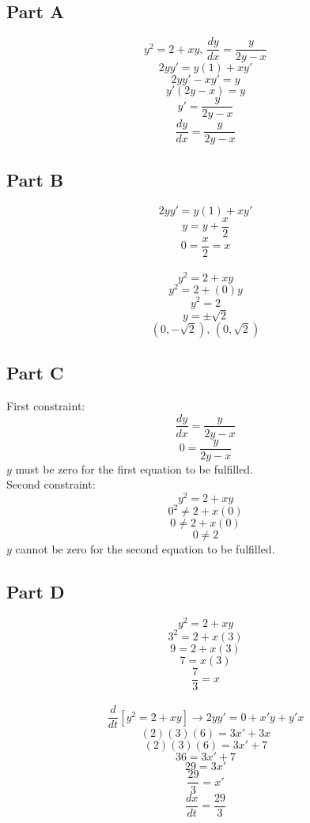 \subsection{Part A}
\[ y^2 = 2 + xy ,\, \frac{dy}{dx} = \frac{y}{2y-x} \]
\[ 2yy' = y(1) + xy' \]
\[ 2yy'- xy' = y  \]
\[ y'(2y- x) = y  \]
\[ y' = \frac{y}{2y-x} \]
\[ \frac{dy}{dx} = \frac{y}{2y-x} \]

\subsection{Part B}
\[ 2yy' = y(1) + xy' \]
\[ y = y + \frac{x}{2} \]
\[ 0 = \frac{x}{2} = x \]
\\
\[ y^2 = 2 + xy \]
\[ y^2 = 2 + (0)y \]
\[ y^2 = 2 \]
\[ y = \pm \sqrt{2} \]
\[ (0, -\sqrt{2}),\,(0, \sqrt{2}) \]

\subsection{Part C}
First constraint:
\[ \frac{dy}{dx} = \frac{y}{2y-x} \]
\[ 0 = \frac{y}{2y-x} \]
$y$ must be zero for the first equation to be fulfilled.
\\
Second constraint:
\[ y^2 = 2 + xy \]
\[ 0^2 \neq 2 + x(0) \]
\[ 0 \neq 2 + x(0) \]
\[ 0 \neq 2 \]
$y$ cannot be zero for the second equation to be fulfilled.

\subsection{Part D}
\[ y^2 = 2 + xy \]
\[ 3^2 = 2 + x(3) \]
\[ 9 = 2 + x(3) \]
\[ 7 = x(3) \]
\[ \frac{7}{3} = x \]
\\
\[ \frac{d}{dt} [y^2 = 2 + xy] \to 2yy' = 0 + x'y + y'x \]
\[ (2)(3)(6) = 3x' + 3x \]
\[ (2)(3)(6) = 3x' + 7 \]
\[ 36 = 3x' + 7 \]
\[ 29 = 3x' \]
\[ \frac{29}{3} = x' \]
\[ \frac{dx}{dt} = \frac{29}{3} \]
